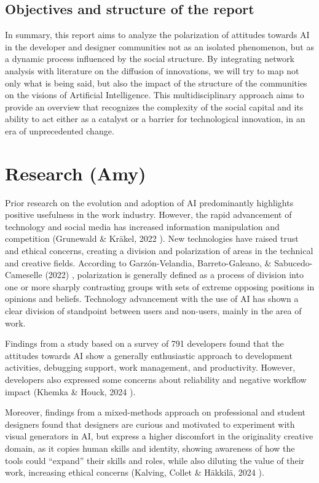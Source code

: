 \documentclass[conference]{IEEEtran}
\begin{document}
\subsection{Objectives and structure of the report}
In summary, this report aims to analyze the polarization of attitudes towards AI in the developer and designer communities not as an isolated phenomenon, but as a dynamic process influenced by the social structure. By integrating network analysis with literature on the diffusion of innovations, we will try to map not only what is being said, but also the impact of the structure of the communities on the visions of Artificial Intelligence. This multidisciplinary approach aims to provide an overview that recognizes the complexity of the social capital and its ability to act either as a catalyst or a barrier for technological innovation, in an era of unprecedented change.

\section{Research (Amy)}
Prior research on the evolution and adoption of AI predominantly highlights positive usefulness in the work industry. However, the rapid advancement of technology and social media has increased information manipulation and competition (Grunewald \& Kräkel, 2022 \cite{b8}). New technologies have raised trust and ethical concerns, creating a division and polarization of areas in the technical and creative fields. According to Garzón-Velandia, Barreto-Galeano, \& Sabucedo-Cameselle (2022) \cite{b9}, polarization is generally defined as a process of division into one or more sharply contrasting groups with sets of extreme opposing positions in opinions and beliefs. Technology advancement with the use of AI has shown a clear division of standpoint between users and non-users, mainly in the area of work.

Findings from a study based on a survey of 791 developers found that the attitudes towards AI show a generally enthusiastic approach to development activities, debugging support, work management, and productivity. However, developers also expressed some concerns about reliability and negative workflow impact (Khemka \& Houck, 2024 \cite{b10}).

Moreover, findings from a mixed-methods approach on professional and student designers found that designers are curious and motivated to experiment with visual generators in AI, but express a higher discomfort in the originality creative domain, as it copies human skills and identity, showing awareness of how the tools could “expand” their skills and roles, while also diluting the value of their work, increasing ethical concerns (Kalving, Collet \& Häkkilä, 2024 \cite{b11}).
\end{document}
